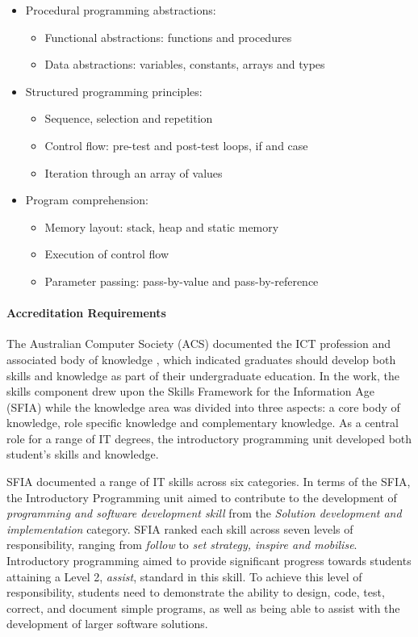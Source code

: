 \begin{itemize}[noitemsep,nolistsep]
	\item Procedural programming abstractions:
	\begin{itemize}[noitemsep,nolistsep]
		\item Functional abstractions: functions and procedures
		\item Data abstractions: variables, constants, arrays and types
	\end{itemize}
	\item Structured programming principles:
	\begin{itemize}[noitemsep,nolistsep]
		\item Sequence, selection and repetition
		\item Control flow: pre-test and post-test loops, if and case
		\item Iteration through an array of values
	\end{itemize}
	\item Program comprehension:
	\begin{itemize}[noitemsep,nolistsep]
		\item Memory layout: stack, heap and static memory
		\item Execution of control flow
		\item Parameter passing: pass-by-value and pass-by-reference
	\end{itemize}
\end{itemize}


\paragraph{Accreditation Requirements} %
\label{par:accreditation_requirements}

The Australian Computer Society (ACS) documented the ICT profession and associated body of knowledge \cite{Gregor:2008}, which indicated graduates should develop both skills and knowledge as part of their undergraduate education. In the work, the skills component drew upon the Skills Framework for the Information Age (SFIA) while the knowledge area was divided into three aspects: a core body of knowledge, role specific knowledge and complementary knowledge. As a central role for a range of IT degrees, the introductory programming unit developed both student's skills and knowledge.

SFIA \cite{SFIA:2011} documented a range of IT skills across six categories. In terms of the SFIA, the Introductory Programming unit aimed to contribute to the development of \emph{programming and software development skill} from the \emph{Solution development and implementation} category. SFIA ranked each skill across seven levels of responsibility, ranging from \emph{follow} to \emph{set strategy, inspire and mobilise}. Introductory programming aimed to provide significant progress towards students attaining a Level 2, \emph{assist}, standard in this skill. To achieve this level of responsibility, students need to demonstrate the ability to design, code, test, correct, and document simple programs, as well as being able to assist with the development of larger software solutions.

